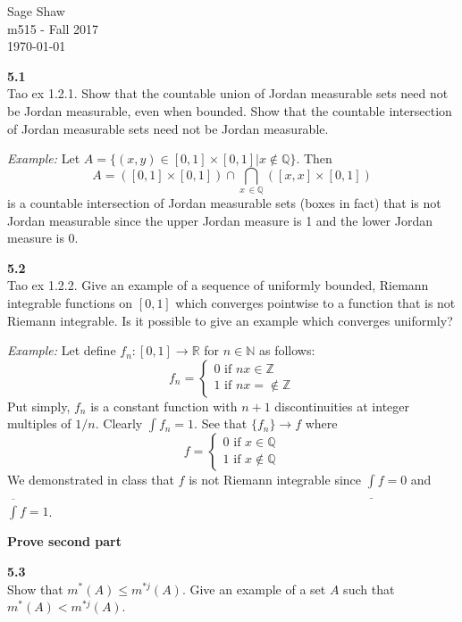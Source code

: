 \documentclass[12pt]{article}
\newcommand{\problem}[1]{\hspace{-4 ex} \large \textbf{#1}\\}
\begin{document}
	\thispagestyle{empty}
	
	\begin{flushright}
		Sage Shaw \\
		m515 - Fall 2017 \\
		\today
	\end{flushright}
	

\problem{5.1} Tao ex 1.2.1. Show that the countable union of Jordan measurable sets need not be Jordan measurable, even when bounded. Show that the countable intersection of Jordan measurable sets need not be Jordan measurable.

	\textit{Example:} Let $A = \{(x,y) \in [0,1] \times [0,1] \vert x \notin \mathbb{Q}\}$. Then $$A = ([0,1] \times [0,1]) \cap \bigcap\limits_{x\ \in \mathbb{Q}}([x,x]\times[0,1])$$ is a countable intersection of Jordan measurable sets (boxes in fact) that is not Jordan measurable since the upper Jordan measure is 1 and the lower Jordan measure is 0.




\problem{5.2} Tao ex 1.2.2. Give an example of a sequence of uniformly bounded, Riemann integrable functions on $[0,1]$ which converges pointwise to a function that is not Riemann integrable. Is it possible to give an example which converges uniformly?

	\textit{Example:} Let define $f_n:[0,1] \to \mathbb{R}$ for $n \in \mathbb{N}$ as follows: 
	\[
		f_n = 
			\begin{cases}
				0 \text{ if } nx \in \mathbb{Z} \\
				1 \text{ if } nx = \notin \mathbb{Z}
			\end{cases}
	\]
	Put simply, $f_n$ is a constant function with $n+1$ discontinuities at integer multiples of $1/n$. Clearly $\int f_n = 1$. See that $\{f_n\} \to f$ where
	\[
		f = 
			\begin{cases}
				0 \text{ if } x \in \mathbb{Q} \\
				1 \text{ if } x \notin \mathbb{Q}
			\end{cases}
	\]
	We demonstrated in class that $f$ is not Riemann integrable since $\underline{\int} f = 0$ and $\overline {\int} f = 1$.
	
	\textbf{Prove second part}



\problem{5.3} Show that $m^*(A)\leq m^{*j}(A)$. Give an example of a set $A$ such that $m^*(A)<m^{*j}(A)$.
	
\end{document}
